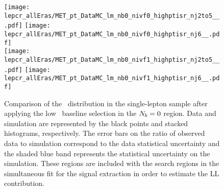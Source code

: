 \begin{figure}[!h]
	\begin{center}
  \texttt{[image: lepcr\_allEras/MET\_pt\_DataMC\_lm\_nb0\_nivf0\_highptisr\_nj2to5\_\_.pdf]}
  \texttt{[image: lepcr\_allEras/MET\_pt\_DataMC\_lm\_nb0\_nivf0\_highptisr\_nj6\_\_.pdf]} \\
  \texttt{[image: lepcr\_allEras/MET\_pt\_DataMC\_lm\_nb0\_nivf1\_highptisr\_nj2to5\_\_.pdf]}
  \texttt{[image: lepcr\_allEras/MET\_pt\_DataMC\_lm\_nb0\_nivf1\_highptisr\_nj6\_\_.pdf]} \\
	\end{center}
	\caption[Lost Lepton LM Control Region $\nb=0$]{Comparison of the \met~distribution in the single-lepton sample after applying the low \dm~baseline selection in the $\nb=0$ region. Data and simulation are represented by the black points and stacked histograms, respectively. The error bars on the ratio of observed data to simulation correspond to the data statistical uncertainty and the shaded blue band represents the statistical uncertainty on the simulation. These regions are included with the search regions in the simultaneous fit for the signal extraction in order to estimate the LL contribution.
	 }
	\label{fig:llb-1lcr-datavsmc-lm-nb0}
\end{figure}
